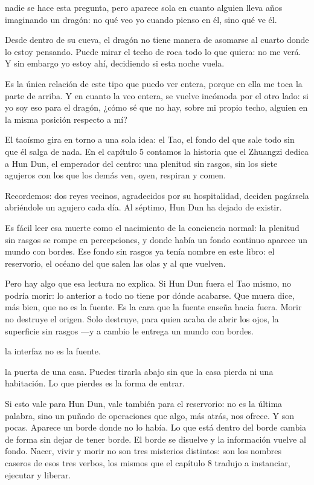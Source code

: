 \noindent {} nadie se hace esta pregunta, pero aparece sola en cuanto alguien lleva años imaginando un dragón: no qué veo yo cuando pienso en él, sino qué ve él.

Desde dentro de su cueva, el dragón no tiene manera de asomarse al cuarto donde lo estoy pensando. Puede mirar el techo de roca todo lo que quiera: no me verá. Y sin embargo yo estoy ahí, decidiendo si esta noche vuela.

Es la única relación de este tipo que puedo ver entera, porque en ella me toca la parte de arriba. Y en cuanto la veo entera, se vuelve incómoda por el otro lado: si yo soy eso para el dragón, ¿cómo sé que no hay, sobre mi propio techo, alguien en la misma posición respecto a mí?

\noindent El taoísmo gira en torno a una sola idea: el Tao, el fondo del que sale todo sin que él salga de nada. En el capítulo 5 contamos la historia que el Zhuangzi dedica a Hun Dun, el emperador del centro: una plenitud sin rasgos, sin los siete agujeros con los que los demás ven, oyen, respiran y comen.

Recordemos: dos reyes vecinos, agradecidos por su hospitalidad, deciden pagársela abriéndole un agujero cada día. Al séptimo, Hun Dun ha dejado de existir.

Es fácil leer esa muerte como el nacimiento de la conciencia normal: la plenitud sin rasgos se rompe en percepciones, y donde había un fondo continuo aparece un mundo con bordes. Ese fondo sin rasgos ya tenía nombre en este libro: el reservorio, el océano del que salen las olas y al que vuelven.

Pero hay algo que esa lectura no explica. Si Hun Dun fuera el Tao mismo, no podría morir: lo anterior a todo no tiene por dónde acabarse. Que muera dice, más bien, que no es la fuente. Es la cara que la fuente enseña hacia fuera. Morir no destruye el origen. Solo destruye, para quien acaba de abrir los ojos, la superficie sin rasgos —y a cambio le entrega un mundo con bordes.

\begin{fisica}
 la interfaz no es la fuente.

 la puerta de una casa. Puedes tirarla abajo sin que la casa pierda ni una habitación. Lo que pierdes es la forma de entrar.
\end{fisica}
\noindent Si esto vale para Hun Dun, vale también para el reservorio: no es la última palabra, sino un puñado de operaciones que algo, más atrás, nos ofrece. Y son pocas. Aparece un borde donde no lo había. Lo que está dentro del borde cambia de forma sin dejar de tener borde. El borde se disuelve y la información vuelve al fondo. Nacer, vivir y morir no son tres misterios distintos: son los nombres caseros de esos tres verbos, los mismos que el capítulo 8 tradujo a instanciar, ejecutar y liberar.

